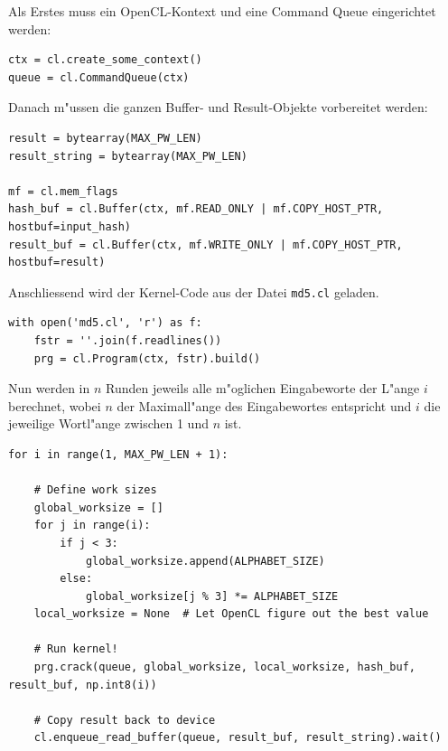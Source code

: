 \begin{refsection}
Als Erstes muss ein OpenCL-Kontext und eine Command Queue eingerichtet werden:

\begin{small}
\begin{verbatim}
ctx = cl.create_some_context()
queue = cl.CommandQueue(ctx)
\end{verbatim}
\end{small}

\noindent Danach m"ussen die ganzen Buffer- und Result-Objekte vorbereitet
werden:

\begin{small}
\begin{verbatim}
result = bytearray(MAX_PW_LEN)
result_string = bytearray(MAX_PW_LEN)

mf = cl.mem_flags
hash_buf = cl.Buffer(ctx, mf.READ_ONLY | mf.COPY_HOST_PTR, hostbuf=input_hash)
result_buf = cl.Buffer(ctx, mf.WRITE_ONLY | mf.COPY_HOST_PTR, hostbuf=result)
\end{verbatim}
\end{small}

\noindent Anschliessend wird der Kernel-Code aus der Datei \texttt{md5.cl}
geladen.

\begin{small}
\begin{verbatim}
with open('md5.cl', 'r') as f:
    fstr = ''.join(f.readlines())
    prg = cl.Program(ctx, fstr).build()
\end{verbatim}
\end{small}

\noindent Nun werden in $n$ Runden jeweils alle m"oglichen Eingabeworte der
L"ange $i$ berechnet, wobei $n$ der Maximall"ange des Eingabewortes entspricht
und $i$ die jeweilige Wortl"ange zwischen 1 und $n$ ist.

\begin{small}
\begin{verbatim}
for i in range(1, MAX_PW_LEN + 1):

    # Define work sizes
    global_worksize = []
    for j in range(i):
        if j < 3:
            global_worksize.append(ALPHABET_SIZE)
        else:
            global_worksize[j % 3] *= ALPHABET_SIZE
    local_worksize = None  # Let OpenCL figure out the best value

    # Run kernel!
    prg.crack(queue, global_worksize, local_worksize, hash_buf, result_buf, np.int8(i))

    # Copy result back to device
    cl.enqueue_read_buffer(queue, result_buf, result_string).wait()
\end{verbatim}
\end{small}


\end{refsection}
